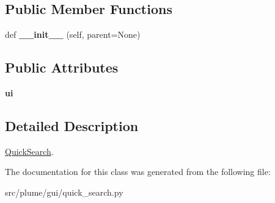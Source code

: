 \subsection*{Public Member Functions}
\begin{DoxyCompactItemize}
\item 
def {\bfseries \+\_\+\+\_\+init\+\_\+\+\_\+} (self, parent=None)\hypertarget{classplume-creator_1_1src_1_1plume_1_1gui_1_1quick__search_1_1_quick_search_a12f01fe83e2fa93e1e189d078cbf069f}{}\label{classplume-creator_1_1src_1_1plume_1_1gui_1_1quick__search_1_1_quick_search_a12f01fe83e2fa93e1e189d078cbf069f}

\end{DoxyCompactItemize}
\subsection*{Public Attributes}
\begin{DoxyCompactItemize}
\item 
{\bfseries ui}\hypertarget{classplume-creator_1_1src_1_1plume_1_1gui_1_1quick__search_1_1_quick_search_ad92bd8a8042fac41c4a992d0ed2afe74}{}\label{classplume-creator_1_1src_1_1plume_1_1gui_1_1quick__search_1_1_quick_search_ad92bd8a8042fac41c4a992d0ed2afe74}

\end{DoxyCompactItemize}


\subsection{Detailed Description}
\hyperlink{classplume-creator_1_1src_1_1plume_1_1gui_1_1quick__search_1_1_quick_search}{Quick\+Search}. 

The documentation for this class was generated from the following file\+:\begin{DoxyCompactItemize}
\item 
src/plume/gui/quick\+\_\+search.\+py\end{DoxyCompactItemize}
